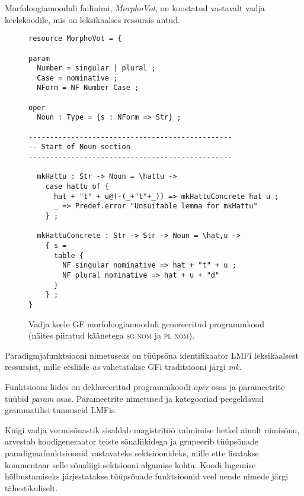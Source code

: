\documentclass[12pt,a4paper]{article}
\newcommand{\msd}[1]{\textsc{#1}}
\begin{document}
Morfoloogiamooduli failinimi, \textit{MorphoVot}, on koostatud vastavalt vadja keele\-koodile, mis on leksikaalses ressursis antud.

\begin{figure}[ht]
  \center
\begin{verbatim}
resource MorphoVot = {

param
  Number = singular | plural ;
  Case = nominative ;
  NForm = NF Number Case ;

oper
  Noun : Type = {s : NForm => Str} ;

------------------------------------------------
-- Start of Noun section
------------------------------------------------

  mkHattu : Str -> Noun = \hattu -> 
    case hattu of {
      hat + "t" + u@(-(_+"t"+_)) => mkHattuConcrete hat u ;
      _ => Predef.error "Unsuitable lemma for mkHattu"
    } ;
  
  mkHattuConcrete : Str -> Str -> Noun = \hat,u -> 
    { s =
      table {
        NF singular nominative => hat + "t" + u ;
        NF plural nominative => hat + u + "d"
      }
    } ;
}
\end{verbatim}
\caption{Vadja keele GF morfoloogia\-mooduli genereeritud programmkood (näites piiratud käänetega \msd{sg nom} ja \msd{pl nom}).
  \label{code:gf-morfoloogia}}
\end{figure}

Paradigmjafunktsiooni nimetuseks on tüüpsõna identifikaator LMFi leksikaalsest ressursist, mille eesliide \textit{as} vahetatakse GFi traditsiooni järgi \textit{mk}.

Funktsiooni liides on deklareeritud programmkoodi \textit{oper} osas ja parameetrite tüübid \textit{param} osas. Parameetrite nimetused ja kategooriad peegeldavad grammatilisi tunnuseid LMFis.

Kuigi vadja vormisõnastik sisaldab magistritöö valmimise hetkel ainult nimisõnu, arvestab koodi\-generaator teiste sõna\-liikidega ja grupeerib tüüpsõnade paradigma\-funktsioonid vastavateks sektsioonideks, mille ette lisatakse kommentaar selle sõnaliigi sektsiooni algamise kohta. Koodi lugemise hõlbustamiseks järjestatakse tüüpsõnade funktsioonid veel nende nimede järgi tähestikuliselt. 
\end{document}
